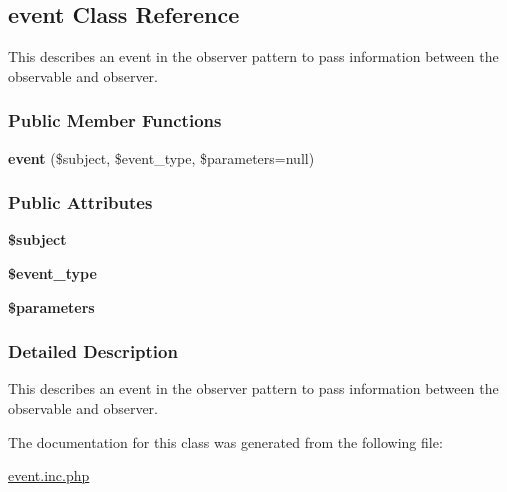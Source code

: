 \hypertarget{classevent}{\subsection{event Class Reference}
\label{classevent}
}


This describes an event in the observer pattern to pass information between the observable and observer.  


\subsubsection*{Public Member Functions}
\begin{DoxyCompactItemize}
\item 
\hypertarget{classevent_abe1c81affe01d911b266e5689d721969}{{\bfseries event} (\$subject, \$event\-\_\-type, \$parameters=null)}\label{classevent_abe1c81affe01d911b266e5689d721969}

\end{DoxyCompactItemize}
\subsubsection*{Public Attributes}
\begin{DoxyCompactItemize}
\item 
\hypertarget{classevent_a06fb7639aadb82d77ab0bee2cbdddcf7}{{\bfseries \$subject}}\label{classevent_a06fb7639aadb82d77ab0bee2cbdddcf7}

\item 
\hypertarget{classevent_ac6fc9038510c56f7d6c5c57d248b70db}{{\bfseries \$event\-\_\-type}}\label{classevent_ac6fc9038510c56f7d6c5c57d248b70db}

\item 
\hypertarget{classevent_a0759049c8b1681ce7337109ca9eac02d}{{\bfseries \$parameters}}\label{classevent_a0759049c8b1681ce7337109ca9eac02d}

\end{DoxyCompactItemize}


\subsubsection{Detailed Description}
This describes an event in the observer pattern to pass information between the observable and observer. 

The documentation for this class was generated from the following file\-:\begin{DoxyCompactItemize}
\item 
\hyperlink{event_8inc_8php}{event.\-inc.\-php}\end{DoxyCompactItemize}
